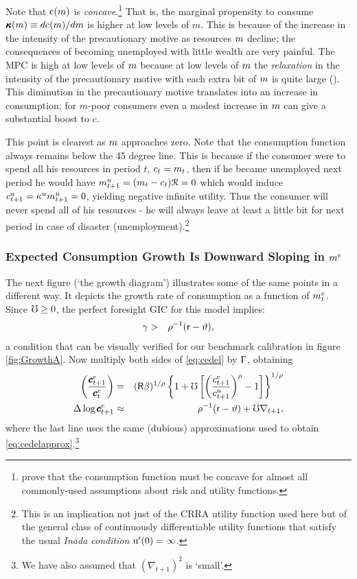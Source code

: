 \documentclass{handout}
\begin{document}
Note that $\mathrm{c}(m)$ is {\it concave}.\footnote{\cite{carroll&kimball:concavity} prove that the consumption
function must be concave for almost all commonly-used assumptions about
risk and utility functions.} That is, the marginal propensity to
consume $\pmb{\kappa}(m) \equiv d \mathrm{c}(m)/d m$ is higher at low levels of $m$.  This is because
of the increase in the intensity of the precautionary motive as resources
$m$ decline; the consequences of becoming unemployed with little wealth are very painful.  The MPC is high at low
levels of $m$ because at low levels of $m$ the {\it relaxation} in the
intensity of the precautionary motive with each extra bit of $m$ is quite large (\cite{kimball:smallandlarge}).
This diminution in the precautionary motive translates into an increase
in consumption; for $m$-poor consumers even a modest increase in $m$ can
give a substantial boost to $c$.

This point is clearest as $m$ approaches zero.  Note that the
consumption function always remains below the 45 degree line.  This
is because if the consumer were to spend all his resources in
period $t$, $c_{t}=m_{t}$, then if he became unemployed next
period he would have ${m}^{u}_{t+1}=(m_{t}-c_{t})\mathcal{R}=0$ which
would induce $c^{u}_{t+1}= \kappa^{u} {m}^{u}_{t+1}=0$, yielding negative
infinite utility.  Thus the consumer will never spend all of his
resources - he will always leave at least a little bit for next period
in case of disaster (unemployment).\footnote{This is an implication not just
of the CRRA utility function used here but of the general class of continuously differentiable utility
functions that satisfy the usual {\it Inada condition} ${\mathrm{u}}^{\prime}(0) = \infty$.}

\subsubsection{Expected Consumption Growth Is Downward Sloping in $m^{e}$}
The next figure (`the growth diagram') illustrates some of the same points in a different
way.  It depicts the growth rate of consumption as a function of $m^{e}_{t}$.
Since $\mho \geq 0$, the perfect foresight GIC for this model
implies:
\begin{eqnarray}
  \gamma & > & \rho^{-1}(\mathsf{r}-\vartheta) ,
\end{eqnarray}
a condition that can be visually verified for our benchmark calibration in figure \ref{fig:GrowthA}.  Now multiply both sides of \eqref{eq:cedel} by $\Gamma$, obtaining
\begin{eqnarray}
        \left(\frac{\pmb{c}^{e}_{t+1}}{\pmb{c}^{e}_{t}}\right) & = & (\mathsf{R}\beta)^{1/\rho} \left\{1+\mho\left[\left(\frac{c^{e}_{t+1}}{c^{u}_{t+1}}\right)^{\rho}-1\right]\right\}^{1/\rho} \label{eq:cLevGro}
\\       \Delta \log \pmb{c}^{e}_{t+1} & \approx & \rho^{-1}(\mathsf{r}-\vartheta) +  \mho \nabla _{t+1}, \label{eq:cLevGroLogUtil}
\end{eqnarray}
where the last line uses the same (dubious) approximations used to obtain
\eqref{eq:cedelapprox}.\footnote{We have also assumed that $(\nabla _{t+1})^{2}$ is `small'.}
\end{document}
